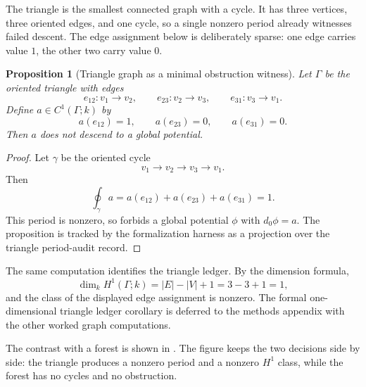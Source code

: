 \documentclass[11pt]{article}
\newtheorem{proposition}[theorem]{Proposition}
\theoremstyle{definition}
\begin{document}
The triangle is the smallest connected graph with a cycle.  It has three
vertices, three oriented edges, and one cycle, so a single nonzero period already
witnesses failed descent.  The edge assignment below is deliberately sparse: one
edge carries value \(1\), the other two carry value \(0\).

\begin{proposition}[Triangle graph as a minimal obstruction witness]
\label{prop:coh-triangle-witness}
Let \(\Gamma\) be the oriented triangle with edges
\[
e_{12}:v_1\to v_2,
\qquad
e_{23}:v_2\to v_3,
\qquad
e_{31}:v_3\to v_1.
\]
Define \(a\in C^1(\Gamma;k)\) by
\[
a(e_{12})=1,
\qquad
a(e_{23})=0,
\qquad
a(e_{31})=0.
\]
Then \(a\) does not descend to a global potential.
\end{proposition}

\begin{proof}
Let \(\gamma\) be the oriented cycle
\[
v_1\to v_2\to v_3\to v_1.
\]
Then
\[
\oint_\gamma a
=
a(e_{12})+a(e_{23})+a(e_{31})
=1.
\]
This period is nonzero, so  forbids a global
potential \(\phi\) with \(d_0\phi=a\).  The proposition is tracked by the
formalization harness as a projection over the triangle period-audit record.
\end{proof}

The same computation identifies the triangle ledger.  By the dimension formula,
\[
\dim_k H^1(\Gamma;k)=|E|-|V|+1=3-3+1=1,
\]
and the class of the displayed edge assignment is nonzero.  The formal
one-dimensional triangle ledger corollary is deferred to the methods appendix
with the other worked graph computations.

The contrast with a forest is shown in .  The figure
keeps the two decisions side by side: the triangle produces a nonzero period and
a nonzero \(H^1\) class, while the forest has no cycles and no obstruction.
\end{document}
